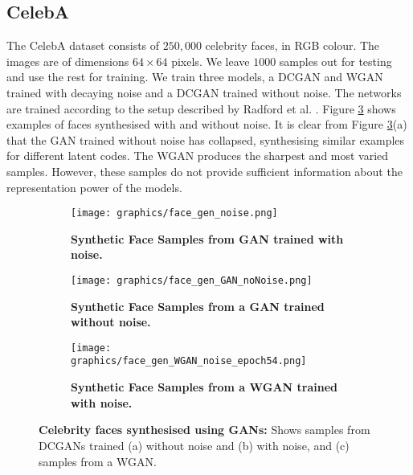 \documentclass[journal]{IEEEtran}
\begin{document}
\subsection{CelebA}
The CelebA dataset consists of $250,000$ celebrity faces, in RGB colour. The images are of dimensions $64\times64$ pixels. We leave $1000$ samples out for testing and use the rest for training. We train three models, a DCGAN and WGAN trained with decaying noise \cite{arjovsky2017towards} and a DCGAN trained without noise. The networks are trained according to the setup described by Radford et al. \cite{radford2015unsupervised}. Figure \ref{fig:face_gen} shows examples of faces synthesised with and without noise. It is clear from Figure \ref{fig:face_gen}(a) that the GAN trained without noise has collapsed, synthesising similar examples for different latent codes. The WGAN produces the sharpest and most varied samples. However, these samples do not provide sufficient information about the representation power of the models.

\begin{figure}
\begin{subfigure}{\columnwidth}
    \centering
    \texttt{[image: graphics/face\_gen\_noise.png]} %
    \caption{\textbf{Synthetic Face Samples from GAN trained with noise.}}
    \label{fig:my_label}
\end{subfigure}
\begin{subfigure}{\columnwidth}
    \centering
    \texttt{[image: graphics/face\_gen\_GAN\_noNoise.png]} %
    \caption{\textbf{Synthetic Face Samples from a GAN trained without noise.}}
    \label{fig:my_label}
\end{subfigure}
\begin{subfigure}{\columnwidth}
    \centering
    \texttt{[image: graphics/face\_gen\_WGAN\_noise\_epoch54.png]} %
    \caption{\textbf{Synthetic Face Samples from a WGAN trained with noise.}}
    \label{fig:face_gen}
\end{subfigure}
\caption{\textbf{Celebrity faces synthesised using GANs:} Shows samples from DCGANs trained (a) without noise and (b) with noise, and (c) samples from a WGAN.}
\label{fig:shoe_gen}
\end{figure}
\end{document}
